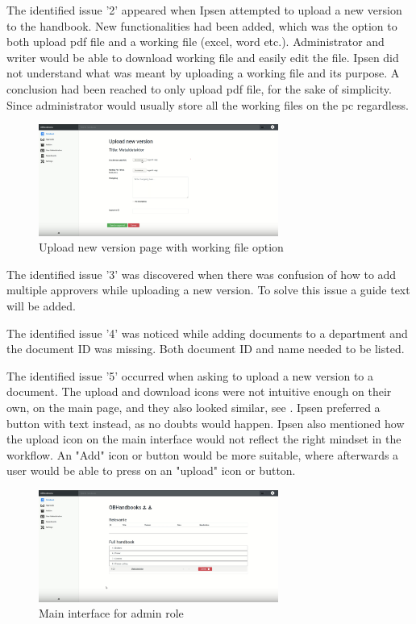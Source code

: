 \documentclass[../../master.tex]{subfiles}
\begin{document}
The identified issue '2' appeared when Ipsen attempted to upload a new version to the handbook.
New functionalities had been added, which was the option to both upload pdf file and a working file (excel, word etc.).
Administrator and writer would be able to download working file and easily edit the file.
Ipsen did not understand what was meant by uploading a working file and its purpose.
A conclusion had been reached to only upload pdf file, for the sake of simplicity.
Since administrator would usually store all the working files on the pc regardless.

\begin{figure}[H]
	\centering
		\includegraphics[width=0.7\textwidth]{billeder/WorkingFile.png}
	\caption{Upload new version page with working file option}\label{fig:WorkingFile}
\end{figure}

The identified issue '3' was discovered when there was confusion of how to add multiple approvers while uploading a new version.
To solve this issue a guide text will be added.

The identified issue '4' was noticed while adding documents to a department and the document ID was missing.
Both document ID and name needed to be listed.

The identified issue '5' occurred when asking to upload a new version to a document.
The upload and download icons were not intuitive enough on their own, on the main page, and they also looked similar, see .
Ipsen preferred a button with text instead, as no doubts would happen.
Ipsen also mentioned how the upload icon on the main interface would not reflect the right mindset in the workflow.
An "Add" icon or button would be more suitable, where afterwards a user would be able to press on an "upload" icon or button.

\begin{figure}[H]
	\centering
		\includegraphics[width=0.7\textwidth]{billeder/MainInterfaceAdmin.png}
	\caption{Main interface for admin role}\label{fig:MainInterfaceAdmin}
\end{figure}
\end{document}
